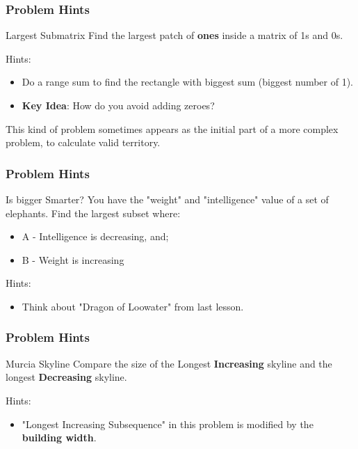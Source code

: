 %
%

\begin{frame}
  \frametitle{Problem Hints}

  \begin{block}{Largest Submatrix}
    Find the largest patch of {\bf ones} inside a matrix of 1s and 0s.
  \end{block}
  \bigskip

  Hints:
  \begin{itemize}
  \item Do a range sum to find the rectangle with biggest
    sum (biggest number of 1).
  \item {\bf Key Idea}: How do you avoid adding zeroes?
  \end{itemize}
  \bigskip

  This kind of problem sometimes appears as the initial part of a more complex problem, to \alert{calculate valid territory}.
\end{frame}

\begin{frame}
  \frametitle{Problem Hints}

  \begin{block}{Is bigger Smarter?}
    You have the "weight" and "intelligence" value of a set of elephants. Find the largest subset where:
    \begin{itemize}
    \item A - Intelligence is decreasing, and;
    \item B - Weight is increasing
    \end{itemize}
  \end{block}
  \bigskip

  Hints:
  \begin{itemize}
  \item Think about "Dragon of Loowater" from last lesson.
  \end{itemize}
\end{frame}

\begin{frame}
  \frametitle{Problem Hints}
  \begin{block}{Murcia Skyline}
    Compare the size of the Longest {\bf Increasing} skyline and the longest {\bf Decreasing} skyline.
  \end{block}
  \bigskip

  Hints:
  \begin{itemize}
  \item "Longest Increasing Subsequence" in this problem is modified by the {\bf building width}.
  \end{itemize}
\end{frame}

